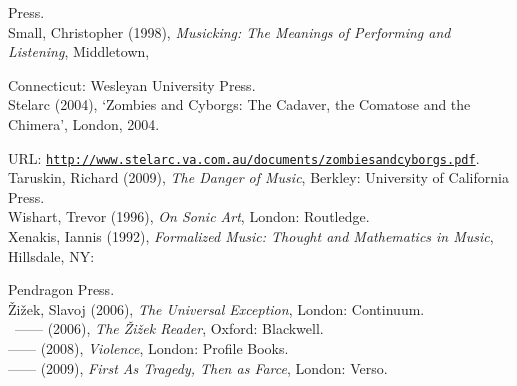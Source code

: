 Press. 
\hypertarget{small}{}\\
Small, Christopher (1998), \emph{Musicking: The Meanings of Performing and Listening}, Middletown, 

Connecticut: Wesleyan University Press. 
\hypertarget{stelarc}{}\\
Stelarc (2004), `Zombies and Cyborgs: The Cadaver, the Comatose and the Chimera', London, 2004.

URL: \href{http://www.stelarc.va.com.au/documents/zombiesandcyborgs.pdf}{\texttt{http://www.stelarc.va.com.au/documents/zombiesandcyborgs.pdf}}.
\hypertarget{taruskin}{}\\
Taruskin, Richard (2009), \emph{The Danger of Music}, Berkley: University of California Press. 
\hypertarget{wishart}{}\\
Wishart, Trevor (1996), \emph{On Sonic Art}, London: Routledge. 
\hypertarget{xenakis}{}\\
Xenakis, Iannis (1992), \emph{Formalized Music: Thought and Mathematics in Music}, Hillsdale, NY: 

Pendragon Press. 
\hypertarget{zizekuniv}{}\\
\v{Z}i\v{z}ek, Slavoj (2006), \emph{The Universal Exception}, London: Continuum. 
\hypertarget{zizekreader}{}\\\
------ (2006), \emph{The \v{Z}i\v{z}ek Reader}, Oxford: Blackwell.\\
------ (2008), \emph{Violence}, London: Profile Books. 
\hypertarget{zizektragedy}{}\\
------ (2009), \emph{First As Tragedy, Then as Farce}, London: Verso.\\
